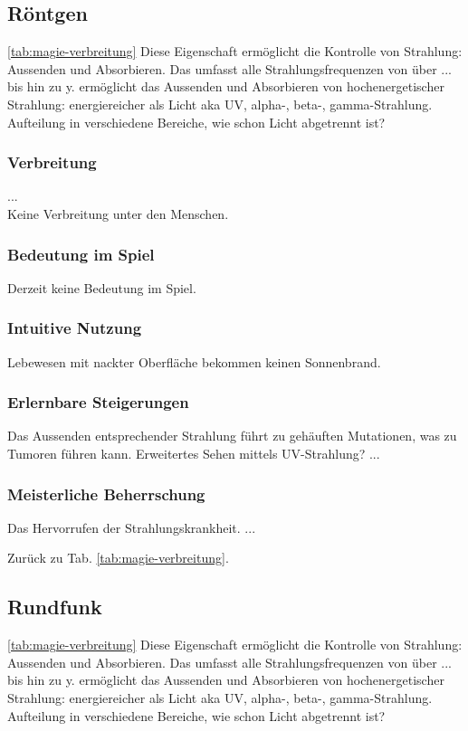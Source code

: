 \subsection{Röntgen}\label{sec:roentgenmagie} \ref{tab:magie-verbreitung} %
Diese Eigenschaft ermöglicht die Kontrolle von Strahlung: Aussenden und Absorbieren. Das umfasst alle Strahlungsfrequenzen von  über ... bis hin zu y.
ermöglicht das Aussenden und Absorbieren von hochenergetischer Strahlung: energiereicher als Licht aka UV, alpha-, beta-, gamma-Strahlung. Aufteilung in verschiedene Bereiche, wie schon Licht abgetrennt ist? 

\subsubsection{Verbreitung}
...\\
Keine Verbreitung unter den Menschen.

\subsubsection{Bedeutung im Spiel}
Derzeit keine Bedeutung im Spiel.

\subsubsection{Intuitive Nutzung}
Lebewesen mit nackter Oberfläche bekommen keinen Sonnenbrand.

\subsubsection{Erlernbare Steigerungen}
\begin{outline}
	\1 Das Aussenden entsprechender Strahlung führt zu gehäuften Mutationen, was zu Tumoren führen kann.
	\1 Erweitertes Sehen mittels UV-Strahlung?
	\1 ...
\end{outline}

\subsubsection{Meisterliche Beherrschung} 
\begin{outline}
	\1 Das Hervorrufen der Strahlungskrankheit.
	\1 ...
\end{outline}
Zurück zu Tab. \ref{tab:magie-verbreitung}.



\subsection{Rundfunk}\label{sec:rundfunkmagie} \ref{tab:magie-verbreitung} %
Diese Eigenschaft ermöglicht die Kontrolle von Strahlung: Aussenden und Absorbieren. Das umfasst alle Strahlungsfrequenzen von  über ... bis hin zu y.
ermöglicht das Aussenden und Absorbieren von hochenergetischer Strahlung: energiereicher als Licht aka UV, alpha-, beta-, gamma-Strahlung. Aufteilung in verschiedene Bereiche, wie schon Licht abgetrennt ist? 

